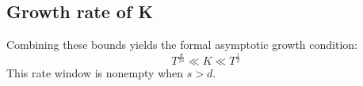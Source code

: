 \documentclass{article}
\begin{document}
\subsection{Growth rate of K}
Combining these bounds yields the formal asymptotic growth condition:
\begin{equation}
    T^{\frac{d}{2s}} \ll K \ll T^{\frac{1}{2}}
\end{equation}
This rate window is nonempty when $s > d$.





\end{document}
